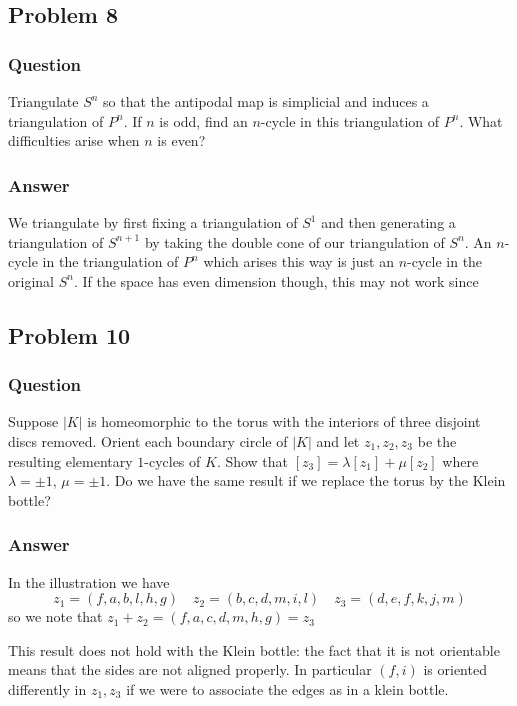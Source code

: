 \documentclass[10pt]{article}
\begin{document}
\subsection{Problem 8}
\subsubsection{Question}
Triangulate $S^n$ so that the antipodal map is simplicial and induces a triangulation of $P^n$. If $n$ is odd, find an $n$-cycle in this triangulation of $P^n$. What difficulties arise when $n$ is even?
\subsubsection{Answer}
We triangulate by first fixing a triangulation of $S^1$ and then generating a triangulation of $S^{n+1}$ by taking the double cone of our triangulation of $S^{n}$. An $n$-cycle in the triangulation of $P^n$ which arises this way is just an $n$-cycle in the original $S^n$. If the space has even dimension though, this may not work since 

\subsection{Problem 10}
\subsubsection{Question}
Suppose $|K|$ is homeomorphic to the torus with the interiors of three disjoint discs removed. Orient each boundary circle of $|K|$ and let $z_1, z_2, z_3$ be the resulting elementary $1$-cycles of $K$. Show that $\left[z_3\right]=\lambda[z_1]+ \mu [z_2]$ where $\lambda = \pm 1$, $\mu = \pm 1$. Do we have the same result if we replace the torus by the Klein bottle?
\subsubsection{Answer}
In the illustration we have
\[z_1 = (f,a,b,l,h,g) \quad z_2 = (b,c,d,m,i,l) \quad z_3= (d,e,f,k,j,m)\]
so we note that $z_1+z_2 = (f,a,c,d,m,h,g) = z_3$

This result does not hold with the Klein bottle: the fact that it is not orientable means that the sides are not aligned properly. In particular $(f,i)$ is oriented differently in $z_1, z_3$ if we were to associate the edges as in a klein bottle.
\end{document}
